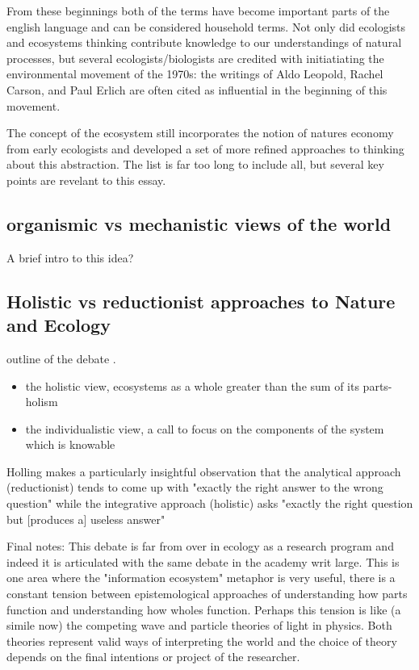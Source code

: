 From these beginnings both of the terms have become important parts of the english language and can be considered household terms. Not only did ecologists and ecosystems thinking contribute knowledge to our understandings of natural processes, but several ecologists/biologists are credited with initiatiating the environmental movement of the 1970s: the writings of Aldo Leopold, Rachel Carson, and Paul Erlich are often cited as influential in the beginning of this movement.

The concept of the ecosystem still incorporates the notion of natures economy from early ecologists and developed a set of more refined approaches to thinking about this abstraction. The list is far too long to include all, but several key points are revelant to this essay. 



\subsection{organismic vs mechanistic views of the world}

A brief intro to this idea?

\subsection{Holistic vs reductionist approaches to Nature and Ecology}

outline of the debate \cite{holling_1998, worster_1977}. \begin{itemize} \item the holistic view, ecosystems as a whole greater than the sum of its parts-holism \cite{clements_1936} \item the individualistic view, a call to focus on the components of the system which is knowable \cite{gleason_1939} \end{itemize}

Holling makes a particularly insightful observation that the analytical approach (reductionist) tends to come up with "exactly the right answer to the wrong question" while the integrative approach (holistic) asks "exactly the right question but [produces a] useless answer" \cite[][p. 3]{holling_1998} 

Final notes: This debate is far from over in ecology as a research program and indeed it is articulated with the same debate in the academy writ large. This is one area where the "information ecosystem" metaphor is very useful, there is a constant tension between epistemological approaches of understanding how  parts function and understanding how wholes function. Perhaps this tension is like (a simile now) the competing wave and particle theories of light in physics. Both theories represent valid ways of interpreting the world and the choice of theory depends on the final intentions or project of the researcher.

